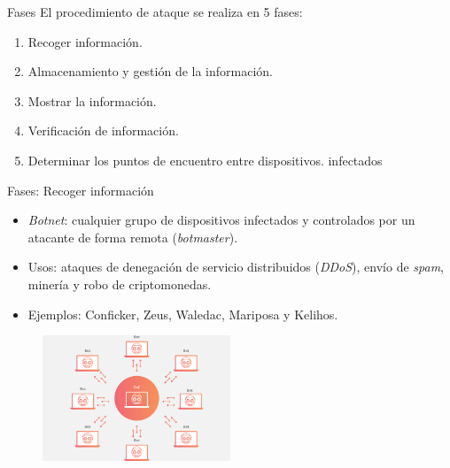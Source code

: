 \documentclass[aspectratio=43]{beamer}
\begin{document}
\begin{frame}{Fases}
  El procedimiento de ataque se realiza en 5 fases:   
  \begin{enumerate}
  \item Recoger información.
  \item Almacenamiento y gestión de la información.
  \item Mostrar la información.
  \item Verificación de información.
  \item Determinar los puntos de encuentro entre dispositivos. infectados
  \end{enumerate}  
\end{frame}




\begin{frame}{Fases: Recoger información}
  
  \begin{itemize}
  \item \emph{Botnet}: cualquier grupo de dispositivos infectados y controlados por un atacante de forma remota (\emph{botmaster}).  
  
  \item Usos: ataques de denegación de servicio distribuidos (\emph{DDoS}), envío de \emph{spam}, minería y robo de criptomonedas.  

 \item Ejemplos: Conficker, Zeus, Waledac, Mariposa y Kelihos. 
 
  \end{itemize}
  
  
\begin{figure}[htbp] 	
   \includegraphics[width=0.50\textwidth]{figuras/botnet}  
  \label{botnet}

\end{figure}

\end{frame}
\end{document}
